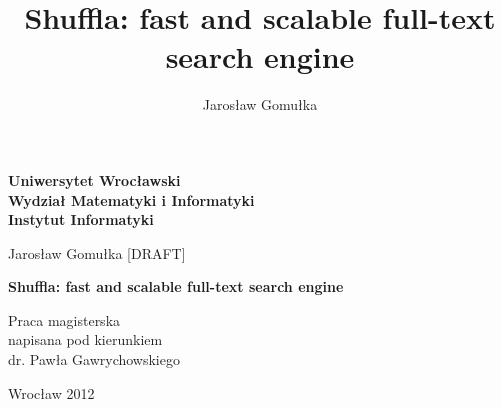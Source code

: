 \documentclass{llncs}
\begin{document}
\topmargin-20pt
\textwidth445pt

\begin{titlepage}
\large

\begin{center}

\textbf{\normalsize%
Uniwersytet Wrocławski\\
Wydział Matematyki i Informatyki\\
Instytut Informatyki}


\vspace{4cm}
Jarosław Gomułka [DRAFT]

\vspace{0.5cm}
\textbf{%
Shuffla: fast and scalable full-text search engine}

\end{center}


\vspace{7cm}
\begin{flushright}
\begin{minipage}[c]{6cm}
  Praca magisterska\\
  napisana pod kierunkiem\\
  dr. Pawła Gawrychowskiego
\end{minipage}
\end{flushright}

\vfill

\begin{center}
 Wrocław 2012
\end{center}

\newpage

\end{titlepage}




\title{Shuffla: fast and scalable full-text search engine}
\author{Jarosław Gomułka}
\institute{}

\maketitle
\end{document}
